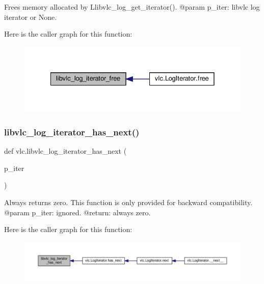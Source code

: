 \begin{DoxyVerb}Frees memory allocated by L{libvlc_log_get_iterator}().
@param p_iter: libvlc log iterator or None.
\end{DoxyVerb}
 Here is the caller graph for this function\+:
\nopagebreak
\begin{figure}[H]
\begin{center}
\leavevmode
\includegraphics[width=328pt]{namespacevlc_a37c59e68be0d4bce98e1f75b4468493b_icgraph}
\end{center}
\end{figure}
\mbox{\label{namespacevlc_a7637cd4511fa87f32eeff4bbfa44907b}} 
\subsubsection{\texorpdfstring{libvlc\+\_\+log\+\_\+iterator\+\_\+has\+\_\+next()}{libvlc\_log\_iterator\_has\_next()}}
{\footnotesize\ttfamily def vlc.\+libvlc\+\_\+log\+\_\+iterator\+\_\+has\+\_\+next (\begin{DoxyParamCaption}\item[{}]{p\+\_\+iter }\end{DoxyParamCaption})}

\begin{DoxyVerb}Always returns zero.
This function is only provided for backward compatibility.
@param p_iter: ignored.
@return: always zero.
\end{DoxyVerb}
 Here is the caller graph for this function\+:
\nopagebreak
\begin{figure}[H]
\begin{center}
\leavevmode
\includegraphics[width=350pt]{namespacevlc_a7637cd4511fa87f32eeff4bbfa44907b_icgraph}
\end{center}
\end{figure}
\mbox{\label{namespacevlc_ae704638f284c91d4cb97d6731606dbef}} 
